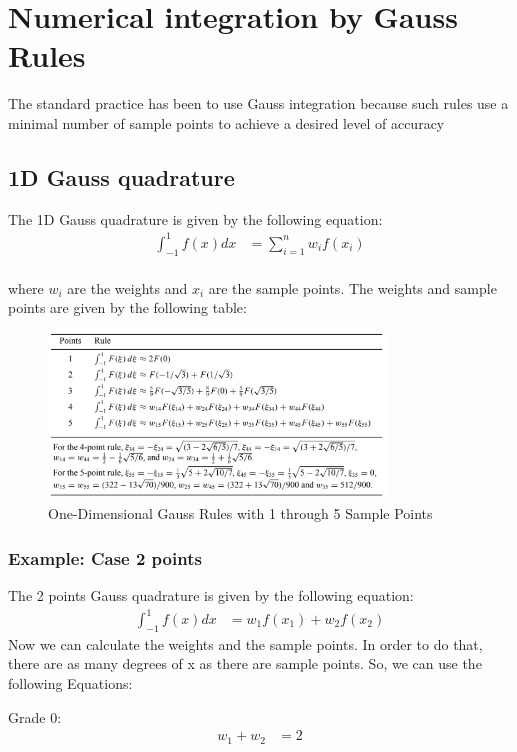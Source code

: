 \documentclass{article}  %
\begin{document}
\section{Numerical integration by Gauss Rules}
The standard practice has been to use Gauss integration because such rules use a minimal number of sample points to achieve a desired level of accuracy
\subsection{1D Gauss quadrature}
The 1D Gauss quadrature is given by the following equation:
\begin{align}
  \int_{-1}^{1} f(x) dx & = \sum_{i=1}^{n} w_i f(x_i) \\
\end{align}

where $w_i$ are the weights and $x_i$ are the sample points. The weights and sample points are given by the following table:
\begin{figure}[h]
    \centering
    \includegraphics[width=0.8\textwidth]{Graphics/gauss_points.PNG}
    \caption{One-Dimensional Gauss Rules with 1 through 5 Sample Points}
    \label{fig:gauss_1d}
\end{figure}

\subsubsection{Example: Case 2 points}
The 2 points Gauss quadrature is given by the following equation:
\begin{align}
  \int_{-1}^{1} f(x) dx & = w_1 f(x_1) + w_2 f(x_2) 
\end{align}
Now we can calculate the weights and the sample points. In order to do that, there are as many degrees of x as there are sample points. So, we can use the following Equations:

Grade 0:
\begin{align}
  w_1 +w_2 &= 2 
\end{align}
\end{document}
